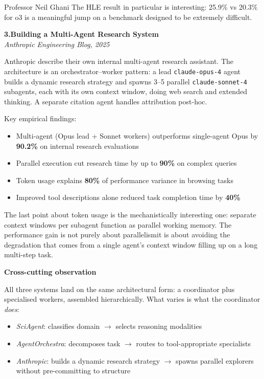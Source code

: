 \documentclass[12pt,a4paper]{letter}
\begin{document}
\begin{letter}{Professor Neil Ghani}
\medskip
The HLE result in particular is interesting: 25.9\% vs 20.3\% for o3 is a meaningful jump on a benchmark designed to be extremely difficult.

\bigskip
\noindent\textbf{3.\quad Building a Multi-Agent Research System}\\
\textit{Anthropic Engineering Blog, 2025}

\smallskip
Anthropic describe their own internal multi-agent research assistant. The architecture is an orchestrator--worker pattern: a lead \texttt{claude-opus-4} agent builds a dynamic research strategy and spawns 3--5 parallel \texttt{claude-sonnet-4} subagents, each with its own context window, doing web search and extended thinking. A separate citation agent handles attribution post-hoc.

Key empirical findings:
\begin{itemize}
  \item Multi-agent (Opus lead + Sonnet workers) outperforms single-agent Opus by \textbf{90.2\%} on internal research evaluations
  \item Parallel execution cut research time by up to \textbf{90\%} on complex queries
  \item Token usage explains \textbf{80\%} of performance variance in browsing tasks
  \item Improved tool descriptions alone reduced task completion time by \textbf{40\%}
\end{itemize}

The last point about token usage is the mechanistically interesting one: separate context windows per subagent function as parallel working memory. The performance gain is not purely about parallelism\textemdash it is about avoiding the degradation that comes from a single agent's context window filling up on a long multi-step task.

\bigskip
\noindent\textbf{Cross-cutting observation}

All three systems land on the same architectural form: a coordinator plus specialised workers, assembled hierarchically. What varies is what the coordinator \emph{does}:
\begin{itemize}
  \item \emph{SciAgent}: classifies domain $\to$ selects reasoning modalities
  \item \emph{AgentOrchestra}: decomposes task $\to$ routes to tool-appropriate specialists
  \item \emph{Anthropic}: builds a dynamic research strategy $\to$ spawns parallel explorers without pre-committing to structure
\end{itemize}


\end{letter}
\end{document}
